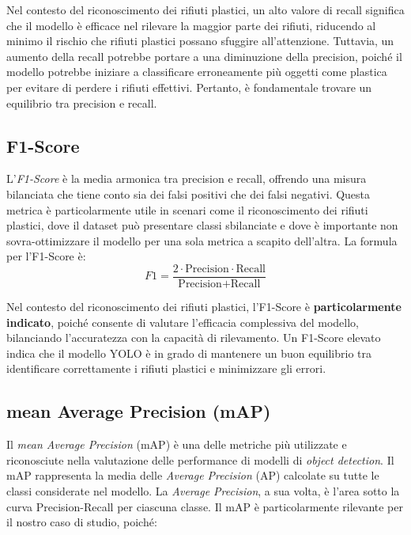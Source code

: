 Nel contesto del riconoscimento dei rifiuti plastici, un alto valore di recall significa che il modello è efficace nel rilevare la maggior parte dei rifiuti, riducendo al minimo il rischio che rifiuti plastici possano sfuggire all'attenzione. Tuttavia, un aumento della recall potrebbe portare a una diminuzione della precision, poiché il modello potrebbe iniziare a classificare erroneamente più oggetti come plastica per evitare di perdere i rifiuti effettivi. Pertanto, è fondamentale trovare un equilibrio tra precision e recall.

\subsection{F1-Score}

L'\textit{F1-Score} è la media armonica tra precision e recall, offrendo una misura bilanciata che tiene conto sia dei falsi positivi che dei falsi negativi. Questa metrica è particolarmente utile in scenari come il riconoscimento dei rifiuti plastici, dove il dataset può presentare classi sbilanciate e dove è importante non sovra-ottimizzare il modello per una sola metrica a scapito dell'altra. La formula per l'F1-Score è:
\begin{equation}
F1 = \frac{2 \cdot \text{Precision} \cdot \text{Recall}}{\text{Precision} + \text{Recall}}
\end{equation}

Nel contesto del riconoscimento dei rifiuti plastici, l'F1-Score è \textbf{particolarmente indicato}, poiché consente di valutare l'efficacia complessiva del modello, bilanciando l'accuratezza con la capacità di rilevamento. Un F1-Score elevato indica che il modello YOLO è in grado di mantenere un buon equilibrio tra identificare correttamente i rifiuti plastici e minimizzare gli errori.

\subsection{mean Average Precision (mAP)}

Il \textit{mean Average Precision} (mAP) è una delle metriche più utilizzate e riconosciute nella valutazione delle performance di modelli di \textit{object detection}. Il mAP rappresenta la media delle \textit{Average Precision} (AP) calcolate su tutte le classi considerate nel modello. La \textit{Average Precision}, a sua volta, è l'area sotto la curva Precision-Recall per ciascuna classe. Il mAP è particolarmente rilevante per il nostro caso di studio, poiché:

